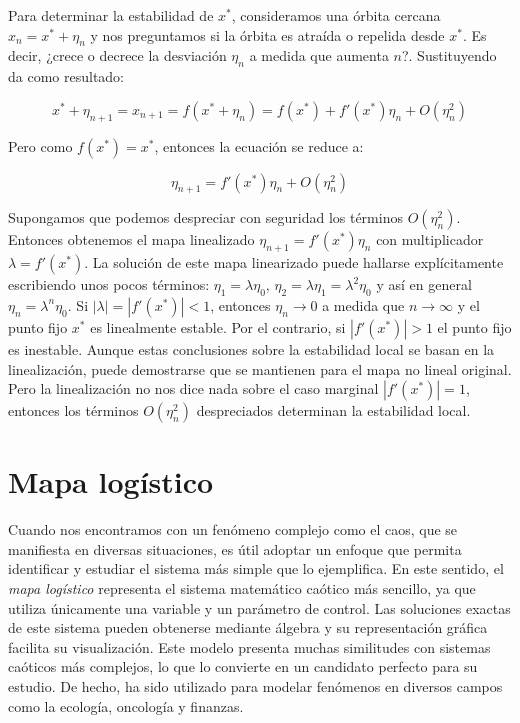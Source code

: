         Para determinar la estabilidad de $x^{*}$, consideramos una órbita cercana $x_{n} = x^{*} + \eta_{n} $ y nos preguntamos si la órbita es atraída o repelida desde $x^{*}$. Es decir, ¿crece o decrece la desviación $\eta_{n}$ a medida que aumenta $n$?. Sustituyendo da como resultado:

        \begin{equation}
            x^{*} + \eta_{n+1} = x_{n+1} = f(x^{*} + \eta_{n}) = f(x^{*}) + f'(x^{*}) \eta_{n} + O(\eta_{n}^{2})
        \end{equation}

        Pero como $f(x^{*}) = x^{*} $, entonces la ecuación se reduce a:

        \begin{equation}
            \eta_{n+1} = f'(x^{*}) \eta_{n} + O(\eta_{n}^{2})
        \end{equation}

        Supongamos que podemos despreciar con seguridad los términos $O(\eta_{n}^{2} )$. Entonces obtenemos el mapa linealizado $ \eta_{n+1} = f'(x^{*}) \eta_{n}$ con multiplicador $\lambda = f'(x^{*} )$. La solución de este mapa linearizado puede hallarse explícitamente escribiendo unos pocos términos: $\eta_{1} = \lambda \eta_{0}$, $\eta_{2} = \lambda \eta_{1} = \lambda^{2} \eta_{0} $ y así en general $\eta_{n} = \lambda^{n} \eta_{0} $. Si $|\lambda| = |f'(x^{*})| < 1$, entonces $\eta_{n} \to 0$ a medida que $n \to \infty$ y el punto fijo $x^{*}$ es linealmente estable. Por el contrario, si $|f'(x^{*})| > 1$ el punto fijo es inestable. Aunque estas conclusiones sobre la estabilidad local se basan en la linealización, puede demostrarse que se mantienen para el mapa no lineal original. Pero la linealización no nos dice nada sobre el caso marginal $|f'(x^{*})| = 1$, entonces los términos $O(\eta_{n}^{2} )$ despreciados determinan la estabilidad local.

    \section{Mapa logístico}

        Cuando nos encontramos con un fenómeno complejo como el caos, que se manifiesta en diversas situaciones, es útil adoptar un enfoque que permita identificar y estudiar el sistema más simple que lo ejemplifica. En este sentido, el \emph{mapa logístico} representa el sistema matemático caótico más sencillo, ya que utiliza únicamente una variable y un parámetro de control. Las soluciones exactas de este sistema pueden obtenerse mediante álgebra y su representación gráfica facilita su visualización. Este modelo presenta muchas similitudes con sistemas caóticos más complejos, lo que lo convierte en un candidato perfecto para su estudio. De hecho, ha sido utilizado para modelar fenómenos en diversos campos como la ecología, oncología y finanzas.\cite{Sprott2003}

